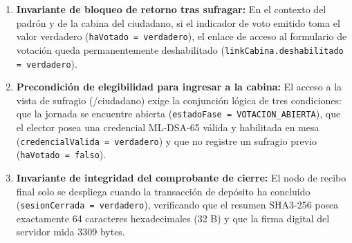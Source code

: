 \begin{enumerate}
	\item \textbf{Invariante de bloqueo de retorno tras sufragar:} En el contexto del padrón y de la cabina del ciudadano, si el indicador de voto emitido toma el valor verdadero (\texttt{haVotado = verdadero}), el enlace de acceso al formulario de votación queda permanentemente deshabilitado (\texttt{linkCabina.deshabilitado = verdadero}).
	\item \textbf{Precondición de elegibilidad para ingresar a la cabina:} El acceso a la vista de sufragio (/ciudadano) exige la conjunción lógica de tres condiciones: que la jornada se encuentre abierta (\texttt{estadoFase = VOTACION\_ABIERTA}), que el elector posea una credencial ML-DSA-65 válida y habilitada en mesa (\texttt{credencialValida = verdadero}) y que no registre un sufragio previo (\texttt{haVotado = falso}).
	\item \textbf{Invariante de integridad del comprobante de cierre:} El nodo de recibo final solo se despliega cuando la transacción de depósito ha concluido (\texttt{sesionCerrada = verdadero}), verificando que el resumen SHA3-256 posea exactamente 64 caracteres hexadecimales (32 B) y que la firma digital del servidor mida 3309 bytes.
\end{enumerate}
